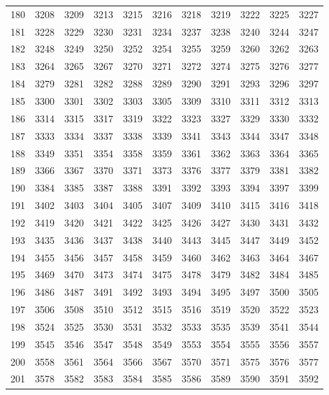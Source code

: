 \begin{longtable}{|r|rrrrrrrrrr|}
  180 & 3208 & 3209 & 3213 & 3215 & 3216 & 3218 & 3219 & 3222 & 3225 & 3227 \\ 
  181 & 3228 & 3229 & 3230 & 3231 & 3234 & 3237 & 3238 & 3240 & 3244 & 3247 \\ 
  182 & 3248 & 3249 & 3250 & 3252 & 3254 & 3255 & 3259 & 3260 & 3262 & 3263 \\ 
  183 & 3264 & 3265 & 3267 & 3270 & 3271 & 3272 & 3274 & 3275 & 3276 & 3277 \\ 
  184 & 3279 & 3281 & 3282 & 3288 & 3289 & 3290 & 3291 & 3293 & 3296 & 3297 \\ 
  185 & 3300 & 3301 & 3302 & 3303 & 3305 & 3309 & 3310 & 3311 & 3312 & 3313 \\ 
  186 & 3314 & 3315 & 3317 & 3319 & 3322 & 3323 & 3327 & 3329 & 3330 & 3332 \\ 
  187 & 3333 & 3334 & 3337 & 3338 & 3339 & 3341 & 3343 & 3344 & 3347 & 3348 \\ 
  188 & 3349 & 3351 & 3354 & 3358 & 3359 & 3361 & 3362 & 3363 & 3364 & 3365 \\ 
  189 & 3366 & 3367 & 3370 & 3371 & 3373 & 3376 & 3377 & 3379 & 3381 & 3382 \\ 
  190 & 3384 & 3385 & 3387 & 3388 & 3391 & 3392 & 3393 & 3394 & 3397 & 3399 \\ 
  191 & 3402 & 3403 & 3404 & 3405 & 3407 & 3409 & 3410 & 3415 & 3416 & 3418 \\ 
  192 & 3419 & 3420 & 3421 & 3422 & 3425 & 3426 & 3427 & 3430 & 3431 & 3432 \\ 
  193 & 3435 & 3436 & 3437 & 3438 & 3440 & 3443 & 3445 & 3447 & 3449 & 3452 \\ 
  194 & 3455 & 3456 & 3457 & 3458 & 3459 & 3460 & 3462 & 3463 & 3464 & 3467 \\ 
  195 & 3469 & 3470 & 3473 & 3474 & 3475 & 3478 & 3479 & 3482 & 3484 & 3485 \\ 
  196 & 3486 & 3487 & 3491 & 3492 & 3493 & 3494 & 3495 & 3497 & 3500 & 3505 \\ 
  197 & 3506 & 3508 & 3510 & 3512 & 3515 & 3516 & 3519 & 3520 & 3522 & 3523 \\ 
  198 & 3524 & 3525 & 3530 & 3531 & 3532 & 3533 & 3535 & 3539 & 3541 & 3544 \\ 
  199 & 3545 & 3546 & 3547 & 3548 & 3549 & 3553 & 3554 & 3555 & 3556 & 3557 \\ 
  200 & 3558 & 3561 & 3564 & 3566 & 3567 & 3570 & 3571 & 3575 & 3576 & 3577 \\ 
  201 & 3578 & 3582 & 3583 & 3584 & 3585 & 3586 & 3589 & 3590 & 3591 & 3592 \\ 

\end{longtable}
